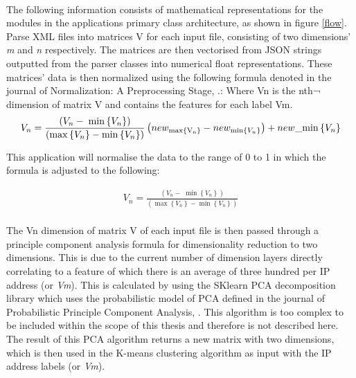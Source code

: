 \paragraph{}The following information consists of mathematical representations for the modules in the applications primary class architecture, as shown in figure \ref{flow}.
Parse XML files into matrices V for each input file, consisting of two dimensions’ \textit{m} and \textit{n} respectively. The matrices are then vectorised from JSON strings outputted from the parser classes into numerical float representations.
These matrices' data is then normalized using the following formula denoted in the journal of Normalization: A Preprocessing Stage, \cite{normalization}.:
Where Vn is the nth¬ dimension of matrix V and contains the features for each label Vm.
\begin{align*}
{V_n} = \frac{{({V_n} - \;\min \left\{ {{V_n}} \right\})}}{{\left( {\max \left\{ {{V_n}} \right\} - \min \left\{ {{V_n}} \right\}} \right)}}\left( {ne{w_{\max \left\{ {{{\rm{V}}_{\rm{n}}}} \right\}}} - ne{w_{{\rm{min}}\left\{ {{V_n}} \right\}}}} \right) + new\_{\rm{min}}\left\{ {{V_n}} \right\}
\end{align*}

This application will normalise the data to the range of 0 to 1 in which the formula is adjusted to the following:

\begin{align*}
{V_n} = \frac{{({V_n} - \;\min \left\{ {{V_n}} \right\})}}{{\left( {\max \left\{ {{V_n}} \right\} - \min \left\{ {{V_n}} \right\}} \right)}}
\end{align*}

\paragraph{}The Vn dimension of matrix V of each input file is then passed through a principle component analysis formula for dimensionality reduction to two dimensions. This is due to the current number of dimension layers directly correlating to a feature of which there is an average of three hundred per IP address (or \textit{Vm}). This is calculated by using the SKlearn PCA decomposition library which uses the probabilistic model of PCA defined in the journal of Probabilistic Principle Component Analysis, \cite{probabilityPCA}. This algorithm is too complex to be included within the scope of this thesis and therefore is not described here. The result of this PCA algorithm returns a new matrix with two dimensions, which is then used in the K-means clustering algorithm as input with the IP address labels (or \textit{Vm}).


